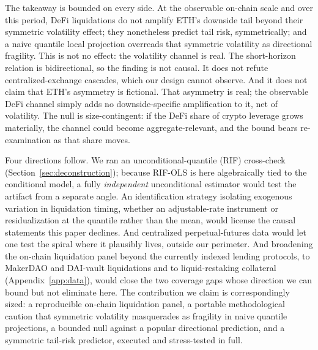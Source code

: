 The takeaway is bounded on every side. At the observable on-chain scale and
over this period, DeFi liquidations do not amplify ETH's downside tail
beyond their symmetric volatility effect; they nonetheless predict tail
risk, symmetrically; and a naive quantile local projection overreads that
symmetric volatility as directional fragility. This is not no effect: the
volatility channel is real. The short-horizon relation is bidirectional, so
the finding is not causal. It does not refute centralized-exchange cascades,
which our design cannot observe. And it does not claim that ETH's asymmetry
is fictional. That asymmetry is real; the observable DeFi channel simply adds no
downside-specific amplification to it, net of volatility.
The null is size-contingent: if the DeFi share of crypto leverage grows
materially, the channel could become aggregate-relevant, and the bound bears
re-examination as that share moves.

Four directions follow. We ran an unconditional-quantile (RIF) cross-check
(Section~\ref{sec:deconstruction}); because RIF-OLS is here algebraically tied
to the conditional model, a fully \emph{independent} unconditional
estimator would test the artifact from a separate angle. An identification
strategy
isolating exogenous variation in liquidation timing, whether an adjustable-rate
instrument or residualization at the quantile rather than the mean, would
license the causal statements this paper declines. And centralized
perpetual-futures data would let one test the spiral where it plausibly
lives, outside our perimeter. And broadening the on-chain liquidation panel
beyond the currently indexed lending protocols, to MakerDAO and DAI-vault
liquidations and to liquid-restaking collateral (Appendix~\ref{app:data}),
would close the two coverage gaps whose direction we can bound but not
eliminate here. The contribution we claim is correspondingly
sized: a reproducible on-chain liquidation panel, a portable methodological
caution that symmetric volatility masquerades as fragility in naive quantile
projections, a bounded null against a popular directional prediction, and a
symmetric tail-risk predictor, executed and stress-tested in full.
